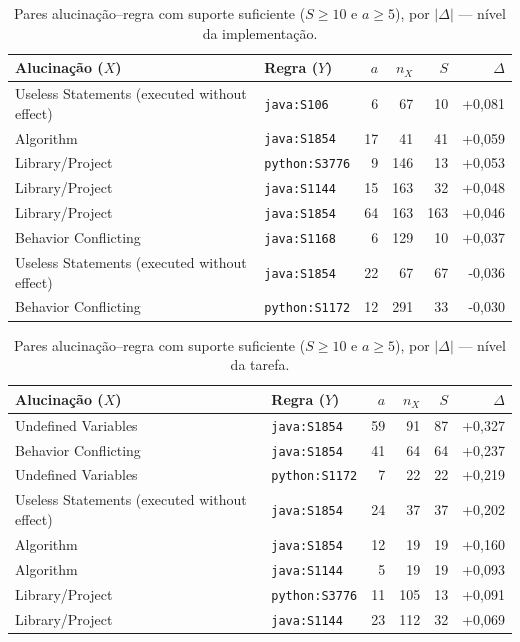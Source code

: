 \begin{table}[ht]
\centering
\caption{Pares alucinação--regra com suporte suficiente ($S\ge 10$ e $a\ge 5$), por $|\Delta|$ --- nível da implementação.}
\label{tab:padroes_impl}
\begin{tabular}{llrrrr}
\hline
Alucinação ($X$) & Regra ($Y$) & $a$ & $n_X$ & $S$ & $\Delta$ \\
\hline
Useless Statements (executed without effect) & \texttt{java:S106} & 6 & 67 & 10 & +0,081 \\
Algorithm & \texttt{java:S1854} & 17 & 41 & 41 & +0,059 \\
Library/Project & \texttt{python:S3776} & 9 & 146 & 13 & +0,053 \\
Library/Project & \texttt{java:S1144} & 15 & 163 & 32 & +0,048 \\
Library/Project & \texttt{java:S1854} & 64 & 163 & 163 & +0,046 \\
Behavior Conflicting & \texttt{java:S1168} & 6 & 129 & 10 & +0,037 \\
Useless Statements (executed without effect) & \texttt{java:S1854} & 22 & 67 & 67 & -0,036 \\
Behavior Conflicting & \texttt{python:S1172} & 12 & 291 & 33 & -0,030 \\
\hline
\end{tabular}
\end{table}

\begin{table}[ht]
\centering
\caption{Pares alucinação--regra com suporte suficiente ($S\ge 10$ e $a\ge 5$), por $|\Delta|$ --- nível da tarefa.}
\label{tab:padroes_task}
\begin{tabular}{llrrrr}
\hline
Alucinação ($X$) & Regra ($Y$) & $a$ & $n_X$ & $S$ & $\Delta$ \\
\hline
Undefined Variables & \texttt{java:S1854} & 59 & 91 & 87 & +0,327 \\
Behavior Conflicting & \texttt{java:S1854} & 41 & 64 & 64 & +0,237 \\
Undefined Variables & \texttt{python:S1172} & 7 & 22 & 22 & +0,219 \\
Useless Statements (executed without effect) & \texttt{java:S1854} & 24 & 37 & 37 & +0,202 \\
Algorithm & \texttt{java:S1854} & 12 & 19 & 19 & +0,160 \\
Algorithm & \texttt{java:S1144} & 5 & 19 & 19 & +0,093 \\
Library/Project & \texttt{python:S3776} & 11 & 105 & 13 & +0,091 \\
Library/Project & \texttt{java:S1144} & 23 & 112 & 32 & +0,069 \\
\hline
\end{tabular}
\end{table}

